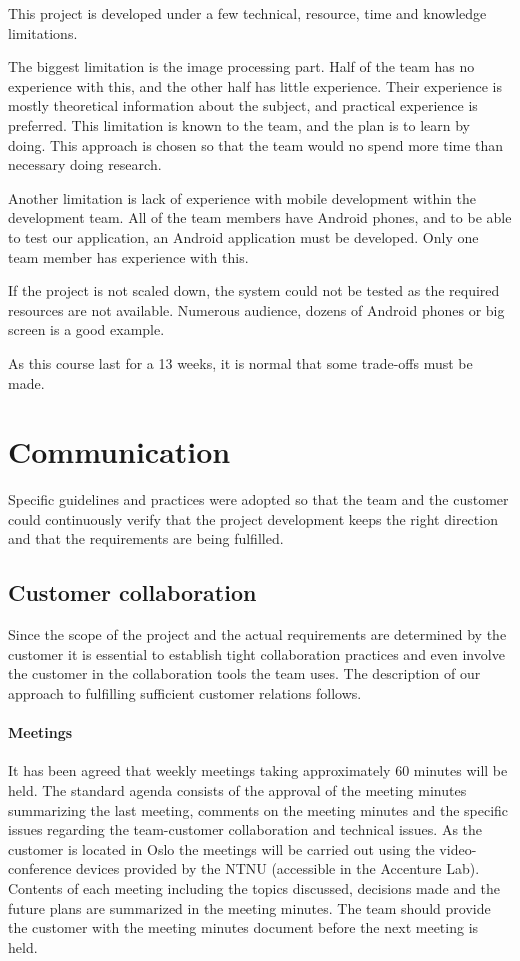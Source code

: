 \label{sec:limitations}
This project is developed under a few technical, resource, time and knowledge limitations. 

The biggest limitation is the image processing part. Half of the team has no experience with this, and the other half has little experience. Their experience is mostly theoretical information about the subject, and practical experience is preferred. This limitation is known to the team, and the plan is to learn by doing. This approach is chosen so that the team would no spend more time than necessary doing research.

Another limitation is lack of experience with mobile development within the development team. All of the team members have Android phones, and to be able to test our application, an Android application must be developed. Only one team member has experience with this. 

If the project is not scaled down, the system could not be tested as the required resources are not available. Numerous audience, dozens of Android phones or big screen is a good example.

As this course last for a 13 weeks, it is normal that some trade-offs must be made.


\section{Communication}
Specific guidelines and practices were adopted so that the team and the customer could continuously verify that the project development keeps the right direction and that the requirements are being fulfilled.

\subsection{Customer collaboration}
Since the scope of the project and the actual requirements are determined by the customer it is essential to establish tight collaboration practices and even involve the customer in the collaboration tools the team uses. The description of our approach to fulfilling sufficient customer relations follows.

\paragraph{Meetings}
It has been agreed that weekly meetings taking approximately 60 minutes will be held. The standard agenda consists of the approval of the meeting minutes summarizing the last meeting, comments on the meeting minutes and the specific issues regarding the team-customer collaboration and technical issues. As the customer is located in Oslo the meetings will be carried out using the video-conference devices provided by the NTNU (accessible in the Accenture Lab). Contents of each meeting including the topics discussed, decisions made and the future plans are summarized in the meeting minutes. The team should provide the customer with the meeting minutes document before the next meeting is held.

